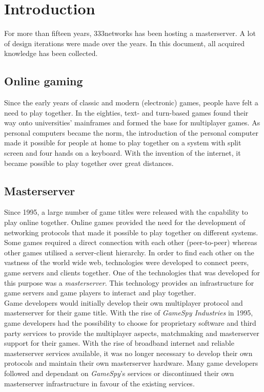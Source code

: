 \chapter{Introduction}
\label{chap:intro}
\setcounter{page}{6}

For more than fifteen years, 333networks has been hosting a masterserver. A lot of design iterations were made over the years. In this document, all acquired knowledge has been collected.

\section{Online gaming}
Since the early years of classic and modern (electronic) games, people have felt a need to play together. In the eighties, text- and turn-based games found their way onto universities' mainframes and formed the base for multiplayer games. As personal computers became the norm, the introduction of the personal computer made it possible for people at home to play together on a system with split screen and four hands on a keyboard. With the invention of the internet, it became possible to play together over great distances.

\section{Masterserver}
Since 1995, a large number of game titles were released with the capability to play online together. Online games provided the need for the development of networking protocols that made it possible to play together on different systems. Some games required a direct connection with each other (peer-to-peer) whereas other games utilised a server-client hierarchy. In order to find each other on the vastness of the world wide web, technologies were developed to connect peers, game servers and clients together. One of the technologies that was developed for this purpose was a \emph{masterserver}. This technology provides an infrastructure for game servers and game players to interact and play together.\\

Game developers would initially develop their own multiplayer protocol and masterserver for their game title. With the rise of \emph{GameSpy Industries} in 1995, game developers had the possibility to choose for proprietary software and third party services to provide the multiplayer aspects, matchmaking and masterserver support for their games. With the rise of broadband internet and reliable masterserver services available, it was no longer necessary to develop their own protocols and maintain their own masterserver hardware. Many game developers followed and dependant on \emph{GameSpy}'s services or discontinued their own masterserver infrastructure in favour of the existing services.

